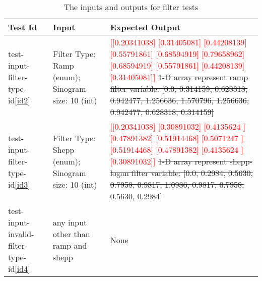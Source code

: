 \documentclass[12pt, titlepage]{article}
\newcommand{\add}{\textcolor{red}}
\begin{document}
\begin{table}[H]
  \centering
  \begin{tabularx}{\linewidth}{|X|X|p{5cm}|}
    \hline
    Test Id                                  & Input                                            & Expected Output                                                                                                                             \\
    \hline
    test-input-filter-type-id\ref{id2}         & Filter Type: Ramp (enum); Sinogram
                                              size: 10 (int)  & \add{[[0.20341038]
                                                                [0.31405081]
                                                                [0.44208139]
                                                                [0.55791861]
                                                                [0.68594919]
                                                                [0.79658962]
                                                                [0.68594919]
                                                                [0.55791861]
                                                                [0.44208139]
                                                                [0.31405081]]}
                                                                \st{1-D array represent ramp filter variable: [0.0, 0.314159, 0.628318, 0.942477, 1.256636, 1.570796, 1.256636, 0.942477, 0.628318, 0.314159]} \\ \hline
    test-input-filter-type-id\ref{id3}         & Filter Type: Shepp (enum);
                                              Sinogram size: 10 (int) & \add{[[0.20341038]
                                                                        [0.30891032]
                                                                        [0.4135624 ]
                                                                        [0.47891382]
                                                                        [0.51914468]
                                                                        [0.5071247 ]
                                                                        [0.51914468]
                                                                        [0.47891382]
                                                                        [0.4135624 ]
                                                                        [0.30891032]]}
                                                                        \st{1-D array represent shepp-logan filter variable: [0.0, 0.2984, 0.5630, 0.7958, 0.9817, 1.0986, 0.9817, 0.7958, 0.5630, 0.2984]}            \\ \hline
    test-input-invalid-filter-type-id\ref{id4} & any input other than ramp and shepp               & None                                                                                                                                        \\ \hline
  \end{tabularx}
  \caption{The inputs and outputs for filter tests}
  \label{TableA}
\end{table}
\end{document}
